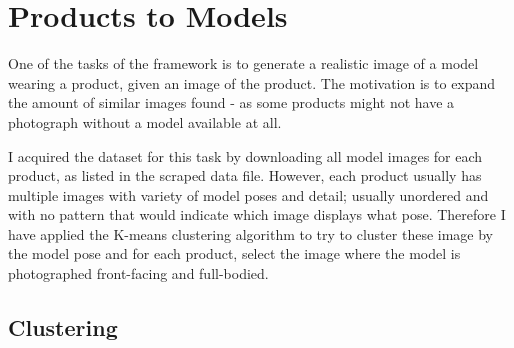\documentclass{article}
\begin{document}
\section{Products to Models}
One of the tasks of the framework is to generate a realistic image of a model wearing a product, given an image of the product. The motivation is to expand the amount of similar images found - as some products might not have a photograph without a model available at all.

I acquired the dataset for this task by downloading all model images for each product, as listed in the scraped data file. However, each product usually has multiple images with variety of model poses and detail; usually unordered and with no pattern that would indicate which image displays what pose. Therefore I have applied the K-means clustering algorithm to try to cluster these image by the model pose and for each product, select the image where the model is photographed front-facing and full-bodied.

\subsection{Clustering}



\newpage


\end{document}
